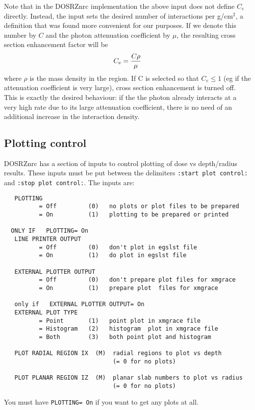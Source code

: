 \documentclass[12pt,twoside]{article}  %
\begin{document}
Note that in the DOSRZnrc implementation the above input does not define
$C_e$ directly. Instead, the input sets the desired number of interactions
per g/cm$^2$, a definition that was found more convenient for our purposes.
If we denote this number by $C$ and the photon attenuation coefficient
by $\mu$, the resulting cross section enhancement factor will be
\begin{equation}
C_e = {C \rho \over \mu}
\end{equation}
where $\rho$ is the mass density in the region. If C is selected
so that $C_e \le 1$ (eg if the attenuation coefficient is very large),
cross section enhancement is turned off. This is exactly the desired
behaviour: if the the photon already interacts at a very high rate due
to its large attenuation coefficient, there is no need of an additional
increase in the interaction density.


\subsection{Plotting control}
\label{dosrzplotsect}

DOSRZnrc has a section of inputs to control plotting of dose
vs depth/radius results.  These inputs must be put between the delimiters
{\tt :start plot control:} and {\tt :stop plot control:}.  The
inputs are:
\begin{verbatim}
   PLOTTING
          = Off         (0)   no plots or plot files to be prepared
          = On          (1)   plotting to be prepared or printed

  ONLY IF   PLOTTING= On
   LINE PRINTER OUTPUT
          = Off         (0)   don't plot in egslst file
          = On          (1)   do plot in egslst file

   EXTERNAL PLOTTER OUTPUT
          = Off         (0)   don't prepare plot files for xmgrace
          = On          (1)   prepare plot  files for xmgrace

   only if   EXTERNAL PLOTTER OUTPUT= On
   EXTERNAL PLOT TYPE
          = Point       (1)   point plot in xmgrace file
          = Histogram   (2)   histogram  plot in xmgrace file
          = Both        (3)   both point plot and histogram

   PLOT RADIAL REGION IX  (M)  radial regions to plot vs depth
                               (= 0 for no plots)

   PLOT PLANAR REGION IZ  (M)  planar slab numbers to plot vs radius
                               (= 0 for no plots)
\end{verbatim}
You must have {\tt PLOTTING= On} if you want to get any plots at all.
\end{document}
